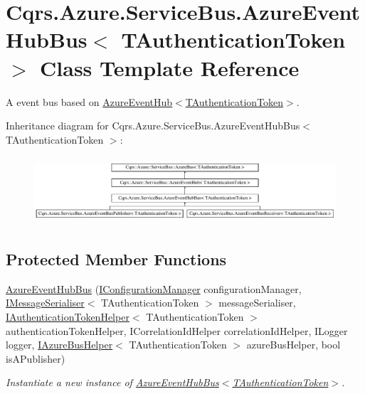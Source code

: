 \hypertarget{classCqrs_1_1Azure_1_1ServiceBus_1_1AzureEventHubBus}{}\section{Cqrs.\+Azure.\+Service\+Bus.\+Azure\+Event\+Hub\+Bus$<$ T\+Authentication\+Token $>$ Class Template Reference}
\label{classCqrs_1_1Azure_1_1ServiceBus_1_1AzureEventHubBus}


A event bus based on \hyperlink{classCqrs_1_1Azure_1_1ServiceBus_1_1AzureEventHub_adef2c26639ae4a7725c397da7fd90000_adef2c26639ae4a7725c397da7fd90000}{Azure\+Event\+Hub$<$\+T\+Authentication\+Token$>$}.  


Inheritance diagram for Cqrs.\+Azure.\+Service\+Bus.\+Azure\+Event\+Hub\+Bus$<$ T\+Authentication\+Token $>$\+:\begin{figure}[H]
\begin{center}
\leavevmode
\includegraphics[height=2.533937cm]{classCqrs_1_1Azure_1_1ServiceBus_1_1AzureEventHubBus}
\end{center}
\end{figure}
\subsection*{Protected Member Functions}
\begin{DoxyCompactItemize}
\item 
\hyperlink{classCqrs_1_1Azure_1_1ServiceBus_1_1AzureEventHubBus_aef24d23dd76d6bb0f58b582e2abf9872_aef24d23dd76d6bb0f58b582e2abf9872}{Azure\+Event\+Hub\+Bus} (\hyperlink{interfaceCqrs_1_1Configuration_1_1IConfigurationManager}{I\+Configuration\+Manager} configuration\+Manager, \hyperlink{interfaceCqrs_1_1Azure_1_1ServiceBus_1_1IMessageSerialiser}{I\+Message\+Serialiser}$<$ T\+Authentication\+Token $>$ message\+Serialiser, \hyperlink{interfaceCqrs_1_1Authentication_1_1IAuthenticationTokenHelper}{I\+Authentication\+Token\+Helper}$<$ T\+Authentication\+Token $>$ authentication\+Token\+Helper, I\+Correlation\+Id\+Helper correlation\+Id\+Helper, I\+Logger logger, \hyperlink{interfaceCqrs_1_1Azure_1_1ServiceBus_1_1IAzureBusHelper}{I\+Azure\+Bus\+Helper}$<$ T\+Authentication\+Token $>$ azure\+Bus\+Helper, bool is\+A\+Publisher)
\begin{DoxyCompactList}\small\item\em Instantiate a new instance of \hyperlink{classCqrs_1_1Azure_1_1ServiceBus_1_1AzureEventHubBus_aef24d23dd76d6bb0f58b582e2abf9872_aef24d23dd76d6bb0f58b582e2abf9872}{Azure\+Event\+Hub\+Bus$<$\+T\+Authentication\+Token$>$}. \end{DoxyCompactList}\end{DoxyCompactItemize}
